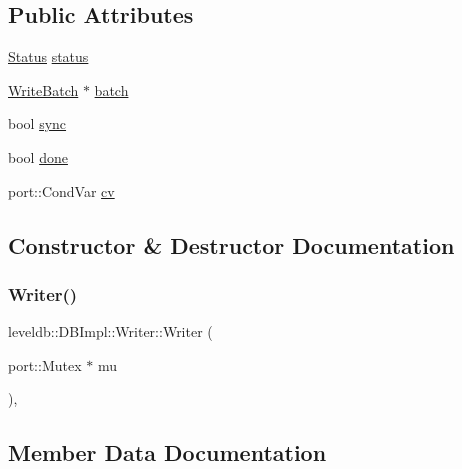 \subsection*{Public Attributes}
\begin{DoxyCompactItemize}
\item 
\mbox{\hyperlink{classleveldb_1_1_status}{Status}} \mbox{\hyperlink{structleveldb_1_1_d_b_impl_1_1_writer_af3b0436a99d2679c0e0ac9f6e1fefa37}{status}}
\item 
\mbox{\hyperlink{classleveldb_1_1_write_batch}{Write\+Batch}} $\ast$ \mbox{\hyperlink{structleveldb_1_1_d_b_impl_1_1_writer_ada051134318411635892f0a7d17cb7c0}{batch}}
\item 
bool \mbox{\hyperlink{structleveldb_1_1_d_b_impl_1_1_writer_acb39717e1fa61127f262b474e18ec9f6}{sync}}
\item 
bool \mbox{\hyperlink{structleveldb_1_1_d_b_impl_1_1_writer_afc6025afd873f82252cb563687bd3106}{done}}
\item 
port\+::\+Cond\+Var \mbox{\hyperlink{structleveldb_1_1_d_b_impl_1_1_writer_aacb835eedc44855a7c223fca024c5ac4}{cv}}
\end{DoxyCompactItemize}


\subsection{Constructor \& Destructor Documentation}
\mbox{\label{structleveldb_1_1_d_b_impl_1_1_writer_a7dfb43a804e1ded7a2a85b3bc756ea93}} 
\subsubsection{\texorpdfstring{Writer()}{Writer()}}
{\footnotesize\ttfamily leveldb\+::\+D\+B\+Impl\+::\+Writer\+::\+Writer (\begin{DoxyParamCaption}\item[{port\+::\+Mutex $\ast$}]{mu }\end{DoxyParamCaption})\hspace{0.3cm}{\ttfamily [inline]}, {\ttfamily [explicit]}}



\subsection{Member Data Documentation}
\mbox{\label{structleveldb_1_1_d_b_impl_1_1_writer_ada051134318411635892f0a7d17cb7c0}} 
